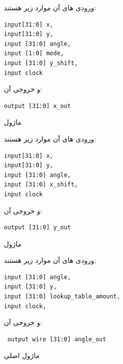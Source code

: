\documentclass[12pt,titlepage,a4page , tikz , multi,table , svgnames,xcdraw]{article}
\begin{document}
 
 ورودی های آن موارد زیر هستند:

\begin{latin}
\begin{verbatim}
input[31:0] x,
input[31:0] y,
input [31:0] angle,
input [1:0] mode,
input [31:0] y_shift,
input clock
\end{verbatim}
\end{latin}

و خروجی آن:

\begin{latin}
\begin{verbatim}
output [31:0] x_out
\end{verbatim}
\end{latin}


\hrulefill
 

ماژول  
 
 ورودی های آن موارد زیر هستند:

\begin{latin}
\begin{verbatim}
input[31:0] x,
input[31:0] y,
input [31:0] angle,
input [31:0] x_shift,
input clock
\end{verbatim}
\end{latin}

و خروجی آن:

\begin{latin}
\begin{verbatim}
output [31:0] y_out
\end{verbatim}
\end{latin}


\hrulefill


ماژول 

 
 ورودی های آن موارد زیر هستند:

\begin{latin}
\begin{verbatim}
input [31:0] angle,
input [31:0] y,
input [31:0] lookup_table_amount,
input clock,
\end{verbatim}
\end{latin}

و خروجی آن:

\begin{latin}
\begin{verbatim}
 output wire [31:0] angle_out
\end{verbatim}
\end{latin}

\hrulefill


 ماژول اصلی   
\end{document}
